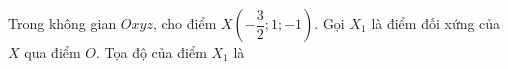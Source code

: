 \begin{ex}
Trong không gian $Oxyz$, cho điểm $X\left(-\dfrac32;1;-1\right)$. Gọi $X_1$ là điểm đối xứng của $X$ qua điểm $O$. Tọa độ của điểm $X_1$ là
\end{ex}
